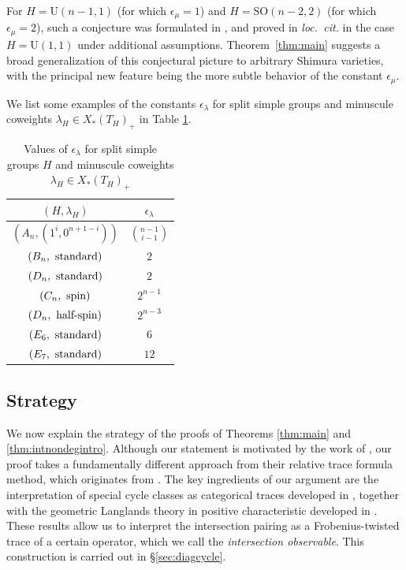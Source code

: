 \documentclass[reqno]{amsart}
\numberwithin{equation}{section}
\numberwithin{equation}{section}
\begin{document}
For $H=\mathrm{U}(n-1,1)$ (for which $\epsilon_{\mu}=1$) and $H=\mathrm{SO}(n-2,2)$ (for which $\epsilon_{\mu}=2$), such a conjecture was formulated in \cite{CLZ}, and proved in \textit{loc.\ cit.} in the case $H=\mathrm{U}(1,1)$ under additional assumptions. Theorem~\ref{thm:main} suggests a broad generalization of this conjectural picture to arbitrary Shimura varieties, with the principal new feature being the more subtle behavior of the constant $\epsilon_{\mu}$.

We list some examples of the constants $\epsilon_{\lambda}$ for split simple groups and minuscule coweights $\lambda_H\in X_*(T_H)_+$ in Table \ref{tab:epsilon}.

\begin{table}[htbp]
    \centering
    \caption{Values of $\epsilon_{\lambda}$ for split simple groups $H$ and minuscule coweights $\lambda_H\in X_*(T_H)_+$}
    \label{tab:epsilon}
    \begin{tabular}{c c}
        \hline
        $(H,\lambda_H)$ & $\epsilon_{\lambda}$ \\
        \hline

        $(A_n,(1^i,0^{n+1-i}))$
            & $\displaystyle \binom{n-1}{i-1}$ \\

        $(B_n,~\textup{standard})$ & $2$ \\
        $(D_n,~\textup{standard})$ & $2$ \\
        $(C_n,~\textup{spin})$ & $2^{n-1}$ \\

        $(D_n,~\textup{half-spin})$ & $2^{n-3}$ \\

        $(E_6,~\textup{standard})$ & $6$ \\ 
        $(E_7,~\textup{standard})$ & $12$ \\ 
        \hline
    \end{tabular}
\end{table}

\subsection{Strategy}

We now explain the strategy of the proofs of Theorems \ref{thm:main} and \ref{thm:intnondegintro}. Although our statement is motivated by the work of \cite{CLZ}, our proof takes a fundamentally different approach from their relative trace formula method, which originates from \cite{zhang2012arithmetic}. The key ingredients of our argument are the interpretation of special cycle classes as categorical traces developed in \cite{wang2025specialcycleshtukascategorical}, together with the geometric Langlands theory in positive characteristic developed in \cite{gaitsgory2025geometriclanglandspositivecharacteristic}. These results allow us to interpret the intersection pairing as a Frobenius-twisted trace of a certain operator, which we call the \emph{intersection observable}. This construction is carried out in \S\ref{sec:diagcycle}.
\end{document}
